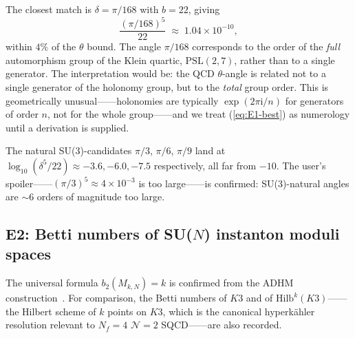 \documentclass[11pt,a4paper]{article}
\newcommand{\PSL}{\mathrm{PSL}}
\providecommand{\ii}{}
\renewcommand{\ii}{\mathrm{i}}
\theoremstyle{plain}
\theoremstyle{definition}
\theoremstyle{remark}
\begin{document}
\begin{keyfind}
The closest match is $\delta = \pi/168$ with $b=22$, giving
\begin{equation}\label{eq:E1-best}
  \frac{(\pi/168)^5}{22} \;\approx\; 1.04\times 10^{-10},
\end{equation}
within $4\%$ of the $\theta$ bound.  The angle $\pi/168$ corresponds to
the order of the \emph{full} automorphism group of the Klein quartic,
$\PSL(2,7)$, rather than to a single generator.  The interpretation
would be: the QCD $\theta$-angle is related not to a single generator
of the holonomy group, but to the \emph{total} group order.  This is
geometrically unusual——holonomies are typically $\exp(2\pi\ii/n)$ for
generators of order $n$, not for the whole group——and we treat
(\ref{eq:E1-best}) as numerology until a derivation is supplied.
\end{keyfind}

The natural SU(3)-candidates $\pi/3$, $\pi/6$, $\pi/9$ land at
$\log_{10}(\delta^5/22) \approx -3.6, -6.0, -7.5$ respectively, all
far from $-10$.  The user's spoiler——$(\pi/3)^5\approx 4\times 10^{-3}$
is too large——is confirmed: SU(3)-natural angles are $\sim 6$ orders
of magnitude too large.

\subsection{E2: Betti numbers of SU($N$) instanton moduli spaces}\label{ssec:E2}

The universal formula $b_2(M_{k,N}) = k$ is confirmed from the
ADHM construction~\cite{kronheimernakajima1990}.  For comparison, the
Betti numbers of $K3$ and of $\mathrm{Hilb}^k(K3)$——the Hilbert scheme
of $k$ points on $K3$, which is the canonical hyperkähler resolution
relevant to $N_f=4$ $\mathcal{N}=2$ SQCD——are also recorded.
\end{document}
